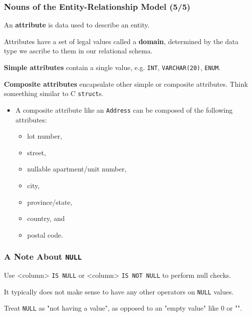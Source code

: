 \begin{frame}
\frametitle{Nouns of the Entity-Relationship Model (5/5)}

An \textbf{attribute} is data used to describe an entity.

Attributes have a set of legal values called a \textbf{domain}, determined by the data type we ascribe to them in our relational schema.

\textbf{Simple attributes} contain a single value, e.g. \texttt{INT}, \texttt{VARCHAR(20)}, \texttt{ENUM}.

\textbf{Composite attributes} encapsulate other simple or composite attributes. Think someething similar to C \texttt{struct}s.
\begin{itemize}
  \item A composite attribute like an \texttt{Address} can be composed of the following attributes:
  \begin{itemize}
    \item lot number,
    \item street,
    \item nullable apartment/unit number,
    \item city,
    \item province/state,
    \item country, and
    \item postal code.
  \end{itemize}
\end{itemize}

\end{frame}


\begin{frame}
\frametitle{A Note About \texttt{NULL}}

Use <column> \texttt{IS NULL} or <column> \texttt{IS NOT NULL} to perform null checks.

It typically does not make sense to have any other operators on \texttt{NULL} values.

Treat \texttt{NULL} as "not having a value", as opposed to an "empty value" like 0 or "".

\end{frame}


